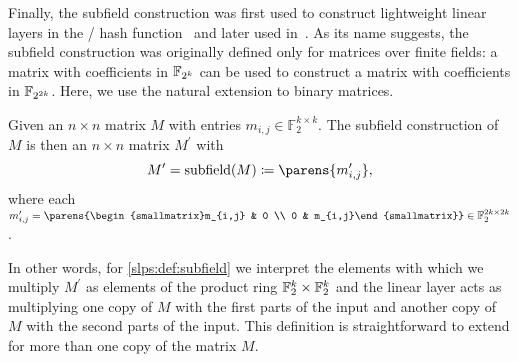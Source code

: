 Finally, the subfield construction was first used to construct lightweight linear layers in the \whirlwind/ hash function~\cite[Section~2.2.2]{DCC:BNNRT10} and later used in~.
As its name suggests, the subfield construction was originally defined only for matrices over finite fields: a matrix with coefficients in $\mathbb{F}_{2^k}$ can be used to construct a matrix with coefficients in $\mathbb{F}_{2^{2k}}$.
Here, we use the natural extension to binary matrices.
\begin{definition}
    \label{slps:def:subfield}
    Given an $n \times n$ matrix $M$ with entries $m_{i,j} \in \mathbb{F}_2^{k \times k}$.
    The subfield construction of $M$ is then an $n \times n$ matrix $M^\prime$ with
    \begin{equation*}
        M^\prime = \subfield(M) \coloneqq \parens{m_{i,j}^\prime},
    \end{equation*}
    where each $m_{i,j}^\prime = \parens{\begin{smallmatrix}m_{i,j} & 0 \\ 0 & m_{i,j}\end{smallmatrix}} \in \mathbb{F}_2^{2k \times 2k}$.
\end{definition}
In other words, for \cref{slps:def:subfield} we interpret the elements with which we multiply $M^\prime$ as elements of the product ring $\mathbb{F}_2^k \times \mathbb{F}_2^k$ and the linear layer acts as multiplying one copy of $M$ with the first parts of the input and another copy of $M$ with the second parts of the input.
This definition is straightforward to extend for more than one copy of the matrix $M$.

